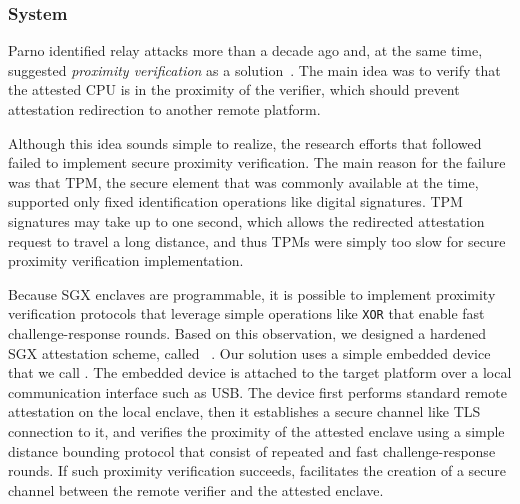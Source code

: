 \subsubsection*{\proximitee System}

Parno identified relay attacks more than a decade ago and, at the same time, suggested \emph{proximity verification} as a solution~\cite{parno2008bootstrapping}. The main idea was to verify that the attested CPU is in the proximity of the verifier, which should prevent attestation redirection to another remote platform. 

Although this idea sounds simple to realize, the research efforts that followed failed to implement secure proximity verification. The main reason for the failure was that TPM, the secure element that was commonly available at the time, supported only fixed identification operations like digital signatures. TPM signatures may take up to one second, which allows the redirected attestation request to travel a long distance, and thus TPMs were simply too slow for secure proximity verification implementation. %

Because SGX enclaves are programmable, it is possible to implement proximity verification protocols that leverage simple operations like \texttt{XOR} that enable fast challenge-response rounds. Based on this observation, we designed a hardened SGX attestation scheme, called \proximitee~\cite{proximitee}. %
Our solution uses a simple embedded device that we call \key. The embedded device is attached to the target platform over a local communication interface such as USB. The \key device first performs standard remote attestation on the local enclave, then it establishes a secure channel like TLS connection to it, and verifies the proximity of the attested enclave using a simple distance bounding protocol that consist of repeated and fast challenge-response rounds. If such proximity verification succeeds, \key facilitates the creation of a secure channel between the remote verifier and the attested enclave. 


